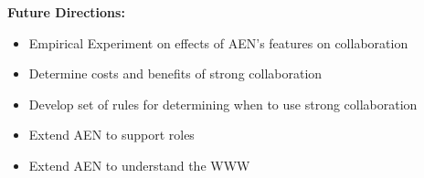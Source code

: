 \begin{slide}\Huge 
  {\bf Future Directions:}
  \horizontalline\\
  \begin{itemize}\huge
  \item Empirical Experiment on effects of AEN's features on collaboration
  \item Determine costs and benefits of strong collaboration
  \item Develop set of rules for determining when to use strong collaboration
  \item Extend AEN to support roles
  \item Extend AEN to understand the WWW
  \end{itemize}
\end{slide}





 





 



